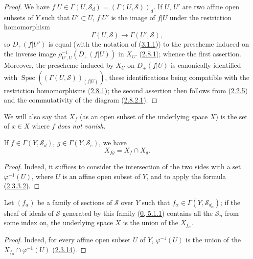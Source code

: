 \begin{proof}
We have $f|U\in\Gamma(U,\mathcal{S}_d)=(\Gamma(U,\mathcal{S}))_d$. If $U$,
$U'$ are two affine open subsets of $Y$ such that $U'\subset U$, $f|U'$ is
the image of $f|U$ under the restriction homomorphism
\[
  \Gamma(U,\mathcal{S})\longrightarrow\Gamma(U',\mathcal{S}),
\]
so $D_+(f|U')$ is equal (with the notation of
(\hyperref[II.3.1.1]{3.1.1})) to the prescheme induced on the inverse image
$\rho_{U',U}^{-1}(D_+(f|U))$ in $X_{U'}$
(\hyperref[II.2.8.1]{2.8.1}); whence the first assertion. Moreover, the
prescheme induced by $X_U$ on $D_+(f|U)$ is canonically identified with
$\operatorname{Spec}((\Gamma(U,\mathcal{S}))_{(f|U)})$, these identifications
being compatible with the restriction homomorphisms
(\hyperref[II.2.8.1]{2.8.1}); the second assertion then follows from
(\hyperref[II.2.2.5]{2.2.5}) and the commutativity of the diagram
(\hyperref[II.2.8.2.1]{2.8.2.1}).
\end{proof}

We will also say that $X_f$ (as an open subset of the underlying space $X$)
is the set of $x\in X$ where $f$ \emph{does not vanish}.

\begin{corollary}[3.1.5]
\label{II.3.1.5}
If $f\in\Gamma(Y,\mathcal{S}_d)$, $g\in\Gamma(Y,\mathcal{S}_e)$, we have
\[
\label{II.3.1.5.1}
  X_{fg}=X_f\cap X_g.
\tag{3.1.5.1}
\]
\end{corollary}

\begin{proof}
Indeed, it suffices to consider the intersection of the two sides with a set
$\varphi^{-1}(U)$, where $U$ is an affine open subset of $Y$, and to apply
the formula (\hyperref[II.2.3.3.2]{2.3.3.2}).
\end{proof}

\begin{corollary}[3.1.6]
\label{II.3.1.6}
Let $(f_\alpha)$ be a family of sections of $\mathcal{S}$ over $Y$ such that
$f_\alpha\in\Gamma(Y,\mathcal{S}_{d_\alpha})$; if the sheaf of ideals of
$\mathcal{S}$ generated by this family
(\hyperref[0.5.1.1]{0, 5.1.1}) contains all the $\mathcal{S}_n$ from some
index on, the underlying space $X$ is the union of the $X_{f_\alpha}$.
\end{corollary}

\begin{proof}
Indeed, for every affine open subset $U$ of $Y$, $\varphi^{-1}(U)$ is the
union of the $X_{f_\alpha}\cap\varphi^{-1}(U)$
(\hyperref[II.2.3.14]{2.3.14}).
\end{proof}

